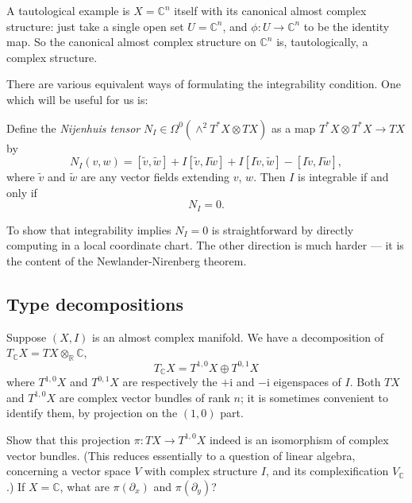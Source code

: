 \documentclass[12pt,letterpaper,reqno]{amsart}
\numberwithin{equation}{section}
\newcommand{\R}{\ensuremath{\mathbb R}}
\newcommand{\C}{\ensuremath{\mathbb C}}
\newcommand{\I}{{\mathrm i}}
\newcommand{\ti}[1]{\textit{#1}}
\begin{document}
\begin{example}[Complex structure on $\C^n$] A tautological example is $X = \C^n$ itself with its 
canonical almost complex structure: just take a single open set $U = \C^n$, and $\phi: U \to \C^n$ to be the identity map. So the canonical almost complex structure on $\C^n$ is, tautologically, a
complex structure.
\end{example}

There are various equivalent ways of formulating the integrability condition. One which will be useful for us is:
\begin{prop} Define the \ti{Nijenhuis tensor} $N_I \in \Omega^0(\wedge^2 T^*X \otimes TX)$ as a map
$T^*X \otimes T^*X \to TX$ by
\begin{equation}
N_I(v,w) = [\tilde v,\tilde w] + I[\tilde v,I \tilde w] + I[I \tilde v, \tilde w] - [I\tilde v,I\tilde w],
\end{equation}
where $\tilde v$ and $\tilde w$ are any vector fields extending $v$, $w$.
Then $I$ is integrable if and only if
\begin{equation}
N_I = 0.  
\end{equation}
\end{prop}
\begin{pf} To show that integrability implies $N_I = 0$ is straightforward
by directly computing in a local coordinate chart. The other direction
is much harder --- it is the content of the Newlander-Nirenberg theorem.
\end{pf}

\subsection{Type decompositions}
Suppose $(X,I)$ is an almost complex manifold.
We have a decomposition
of $T_\C X = TX \otimes_\R \C$,
\begin{equation}
T_\C X = T^{1,0} X \oplus T^{0,1} X
  \end{equation}
where $T^{1,0} X$ and $T^{0,1} X$ are 
respectively the
$+\I$ and $-\I$ eigenspaces of $I$.
Both $TX$ and $T^{1,0}X$ are complex vector bundles 
of rank $n$; it is sometimes convenient to identify
them, by projection on the $(1,0)$ part.

\begin{exercise}
Show that this projection $\pi: TX \to T^{1,0}X$ indeed is an isomorphism 
of complex vector bundles. (This reduces essentially
to a question of linear algebra, concerning 
a vector space $V$ with complex structure $I$,
and its complexification $V_\C$.) If $X = \C$, 
what are $\pi(\partial_x)$ and $\pi(\partial_y)$?
\end{exercise}
\end{document}
